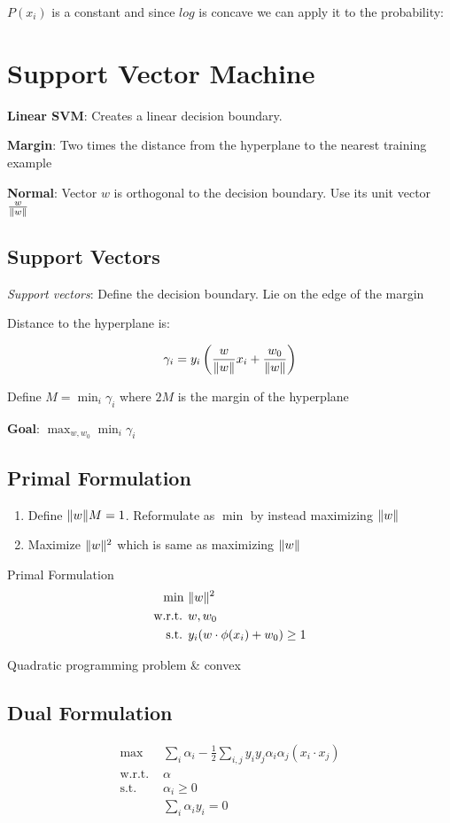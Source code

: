 \documentclass[10pt]{article}
\newcommand{\colortext}[2]{{\color{#1} #2}}
\newcommand{\red}[1]{\colortext{red}{#1}}
\newcommand{\blue}[1]{\colortext{blue}{#1}}
\DeclarePairedDelimiter{\norm}{\lVert}{\rVert}
\begin{document}
\begin{multicols}{3}
  $P(x_i)$ is a constant and since $log$ is concave we can apply it to the probability:

  \section{Support Vector Machine}

  \textbf{Linear SVM}: Creates a linear decision boundary.

  \textbf{Margin}: \red{Two} times the distance from the hyperplane to the nearest training example

  \textbf{Normal}: Vector $w$ is orthogonal to the decision boundary.  Use its unit vector $\frac{w}{\norm{w}}$

  \subsection*{Support Vectors}

  \textit{Support vectors}: Define the decision boundary. \red{Lie on the edge of the margin}

  Distance to the hyperplane is:

  \[ \gamma_i = y_i \left(\frac{w}{\norm{w}} x_i + \frac{w_0}{\norm{w}}\right) \]

  Define $M=\min_i \gamma_i$ where $2M$ is the \blue{margin of the hyperplane}

  \textbf{Goal}: $\max_{w,w_0}\min_{i} \gamma_i$

  \subsection*{Primal Formulation}
  \begin{enumerate}
    \item Define $\norm{w}M = 1$.  Reformulate as $\min$ by instead maximizing $\norm{w}$
    \item Maximize $\norm{w}^2$ which is same as maximizing $\norm{w}$
  \end{enumerate}

  \blue{Primal Formulation}
  \begin{align*}
    \text{min }    &\norm{w}^{2}\\
    \text{w.r.t. } &w,w_0 \\
    \text{s.t. }   &y_i(w\cdot \phi(x_i) +w_0) \geq 1
  \end{align*}

  \red{Quadratic programming} problem \& convex

  \subsection*{Dual Formulation}
  \begin{align*}
    \text{max }    &\sum_{i}\alpha_i - \frac{1}{2}\sum_{i,j}y_{i}y_{j}\alpha_{i}\alpha_{j}(x_i\cdot x_j) \\
    \text{w.r.t. } &\alpha \\
    \text{s.t. }   &\alpha_i \geq 0 \\
                   & \sum_i \alpha_i y_i = 0
  \end{align*}


\end{multicols}
\end{document}
